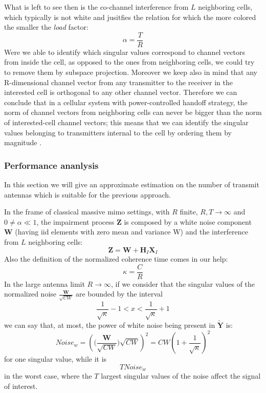 \documentclass[11pt]{book}
\begin{document}
What is left to see then is the co-channel interference from $L$ neighboring cells, which typically is not white and jusitfies the relation for which the more colored the smaller the \textit{load} factor:
\begin{equation}
  \alpha = \frac{T}{R}
\end{equation}
Were we able to identify which singular values correspond to channel vectors from inside the cell, as opposed to the ones from neighboring cells, we could try to remove them by subspace projection. Moreover we keep also in mind that any R-dimensional channel vector from any transmitter to the receiver in the interested cell is orthogonal to any other channel vector. Therefore we can conclude that in a cellular system with power-controlled handoff strategy, the norm of channel vectors from neighboring cells can never be bigger than the norm of interested-cell channel vectors; this means that we can identify the singular values belonging to transmitters internal to the cell by ordering them by magnitude \cite{Ralf}.

\subsubsection{Performance ananlysis}
In this section we will give an approximate estimation on the number of transmit antennas which is suitable for the previous approach.

In the frame of classical massive \gls{mimo} settings, with $R$ finite, $R,T \rightarrow \infty$ and $0 \neq \alpha \ll 1$, the impairment process $\mathbf{Z}$ is composed by a white noise component $\mathbf{W}$ (having iid elements with zero mean and variance W) and the interference from $L$ neighboring cells:
\begin{equation}
  \mathbf{Z} = \mathbf{W} + \mathbf{H}_I\mathbf{X}_I
\end{equation}
Also the definition of the normalized coherence time comes in our help:
\begin{equation}
  \kappa = \frac{C}{R}
\end{equation}
In the large antenna limit $R \rightarrow \infty$, if we consider that the singular values of the normalized noise $\frac{\mathbf{W}}{\sqrt{CW}}$ are bounded by the interval
\begin{equation}
  \frac{1}{\sqrt{\kappa}} - 1 < x < \frac{1}{\sqrt{\kappa}} + 1
\end{equation}
we can say that, at most, the power of white noise being present in $\mathbf{\tilde{Y}}$ is:
\begin{equation}
  Noise_w = \left(\Big(\frac{\mathbf{W}}{\sqrt{CW}}\Big)\sqrt{CW}\right)^2 = CW\left(1+\frac{1}{\sqrt{\kappa}}\right)^2
\end{equation}
for one singular value, while it is
\begin{equation}
  TNoise_w
\end{equation}
in the worst case, where the $T$ largest singular values of the noise affect the signal of interest.
\end{document}
